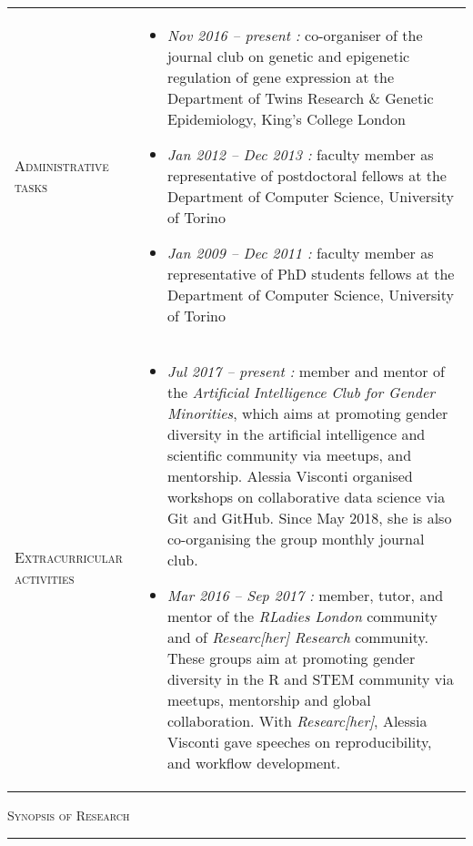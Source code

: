 \documentclass[a4paper,10pt]{article}
\newcommand{\mediumtitle}[1]{
	\vspace{0.2cm}
	{\noindent
	\Large \textsc{#1}\\[-2ex]
	\hrule
	\vspace{0.2cm}}
}
\newenvironment{doubletablelist}
{
	\vspace{-0.2cm}
	\begin{longtable}[!h]{AB}}{\end{longtable}
}
\newcommand{\dtlist}[2]{
\hspace{-3cm}
\noindent
	\begin{minipage}{0.24\textwidth}
	\begin{flushright}
	\textsc{#1}
	\end{flushright}
	\end{minipage}
	& #2\\[0.2cm]
}
\newcommand{\minusitem}{\item[-]}
\begin{document}
\begin{doubletablelist}

\dtlist{Administrative tasks}{
	\vspace{-0.6cm}
	\begin{itemize}[itemsep=-0.5ex]
		\minusitem  \emph{Nov 2016 -- present : } co-organiser of the journal club on genetic and epigenetic regulation of gene expression at the Department of Twins Research \& Genetic Epidemiology, King's College London
		\minusitem  \emph{Jan 2012 -- Dec 2013 : } faculty member as representative of postdoctoral fellows at the Department of Computer Science, University of Torino
		\minusitem  \emph{Jan 2009 -- Dec 2011 : } faculty member as representative of PhD students fellows at the Department of Computer Science, University of Torino
	\end{itemize}
}


\dtlist{Extracurricular activities}{
	\vspace{-0.9cm}
	\begin{itemize}[itemsep=-0.5ex]
		\minusitem \emph{Jul 2017 -- present : } member and mentor of the \emph{Artificial Intelligence Club for Gender Minorities}, which aims at promoting gender diversity in the artificial intelligence and scientific community via meetups, and mentorship. Alessia Visconti organised workshops on collaborative data science via Git and GitHub. Since May 2018, she is also co-organising the group monthly journal club.
		\minusitem  \emph{Mar 2016 -- Sep 2017 : } member, tutor, and mentor of the \emph{RLadies London} community and of \emph{Researc[her] Research} community. These groups aim at promoting gender diversity in the R and STEM community via meetups, mentorship and global collaboration. With \emph{Researc[her]}, Alessia Visconti gave speeches on reproducibility, and workflow development.
	\end{itemize}
}
\end{doubletablelist}

\newpage


\mediumtitle{Synopsis of Research}
\end{document}
